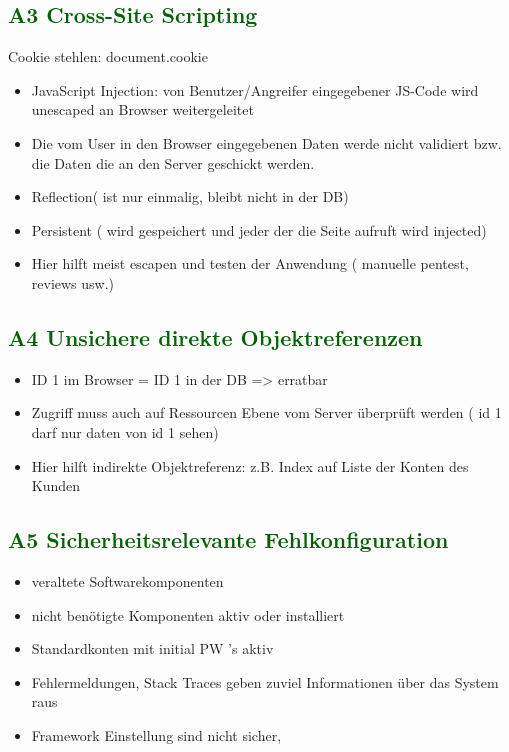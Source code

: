 \subsection*{\textcolor{darkgreen}{A3 Cross-Site Scripting}}
	Cookie stehlen: document.cookie
	\begin{itemize}
	\item JavaScript Injection: von Benutzer/Angreifer eingegebener JS-Code wird unescaped an Browser weitergeleitet
	\item Die vom User in den Browser eingegebenen Daten werde nicht validiert bzw. die Daten die an den Server geschickt werden. 
	\item Reflection( ist nur einmalig, bleibt nicht in der DB) 
	\item Persistent ( wird gespeichert und jeder der die Seite aufruft wird injected)
	\item Hier hilft meist escapen und testen der Anwendung ( manuelle pentest, reviews usw.) 
	\end{itemize}
\subsection*{\textcolor{darkgreen}{A4 Unsichere direkte Objektreferenzen}}

	\begin{itemize}
	\item ID 1 im Browser = ID 1 in der DB => erratbar
	\item Zugriff muss auch auf Ressourcen Ebene vom Server überprüft werden ( id 1 darf nur daten von id 1 sehen)
	\item Hier hilft indirekte Objektreferenz: z.B. Index auf Liste der Konten des Kunden
	\end{itemize}



\subsection*{\textcolor{darkgreen}{A5 Sicherheitsrelevante Fehlkonfiguration}}

	\begin{itemize}
	\item veraltete Softwarekomponenten
	\item nicht benötigte Komponenten aktiv oder installiert
	\item Standardkonten mit initial PW\'{ '}s aktiv 
	\item Fehlermeldungen, Stack Traces geben zuviel Informationen über das System raus
	\item Framework Einstellung sind nicht sicher,
	\end{itemize}

